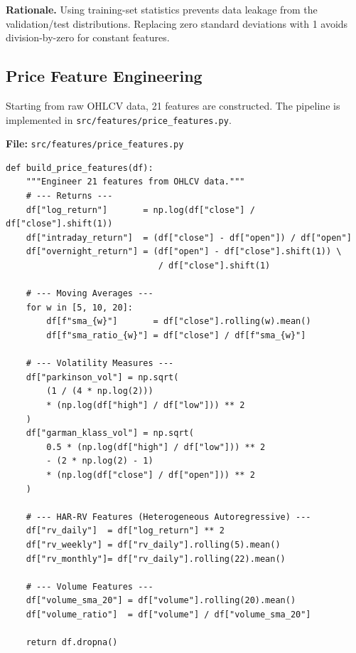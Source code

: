 \documentclass[12pt, a4paper]{article}
\begin{document}
\textbf{Rationale.}  Using training-set statistics prevents data leakage from the validation/test distributions.  Replacing zero standard deviations with 1 avoids division-by-zero for constant features.


\subsection{Price Feature Engineering}
\label{sec:price-features}

Starting from raw OHLCV data, 21 features are constructed.  The pipeline is implemented in \texttt{src/features/price\_features.py}.

\noindent\textbf{File:} \texttt{src/features/price\_features.py}

\begin{lstlisting}[caption={Price feature engineering (excerpt)}]
def build_price_features(df):
    """Engineer 21 features from OHLCV data."""
    # --- Returns ---
    df["log_return"]       = np.log(df["close"] / df["close"].shift(1))
    df["intraday_return"]  = (df["close"] - df["open"]) / df["open"]
    df["overnight_return"] = (df["open"] - df["close"].shift(1)) \
                              / df["close"].shift(1)
    
    # --- Moving Averages ---
    for w in [5, 10, 20]:
        df[f"sma_{w}"]       = df["close"].rolling(w).mean()
        df[f"sma_ratio_{w}"] = df["close"] / df[f"sma_{w}"]
    
    # --- Volatility Measures ---
    df["parkinson_vol"] = np.sqrt(
        (1 / (4 * np.log(2)))
        * (np.log(df["high"] / df["low"])) ** 2
    )
    df["garman_klass_vol"] = np.sqrt(
        0.5 * (np.log(df["high"] / df["low"])) ** 2
        - (2 * np.log(2) - 1)
        * (np.log(df["close"] / df["open"])) ** 2
    )
    
    # --- HAR-RV Features (Heterogeneous Autoregressive) ---
    df["rv_daily"]  = df["log_return"] ** 2
    df["rv_weekly"] = df["rv_daily"].rolling(5).mean()
    df["rv_monthly"]= df["rv_daily"].rolling(22).mean()
    
    # --- Volume Features ---
    df["volume_sma_20"] = df["volume"].rolling(20).mean()
    df["volume_ratio"]  = df["volume"] / df["volume_sma_20"]
    
    return df.dropna()
\end{lstlisting}
\end{document}
